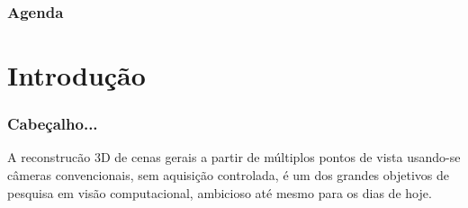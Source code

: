 \documentclass[table, usenames, svgnames, dvipsnames]{beamer}
\begin{document}

\begin{frame}
\frametitle{\textbf{Agenda}}

	\hspace*{+4.0em}
	\footnotesize{ \tableofcontents }
\end{frame}


\section{Introdução}

\begin{frame} 
\frametitle{\textbf{Cabeçalho...}}
A reconstrucão 3D de cenas gerais a partir de múltiplos pontos de vista usando-se
câmeras convencionais, sem aquisição controlada, é um dos grandes objetivos de pesquisa
em visão computacional, ambicioso até mesmo para os dias de hoje. 


\end{frame}
\end{document}
